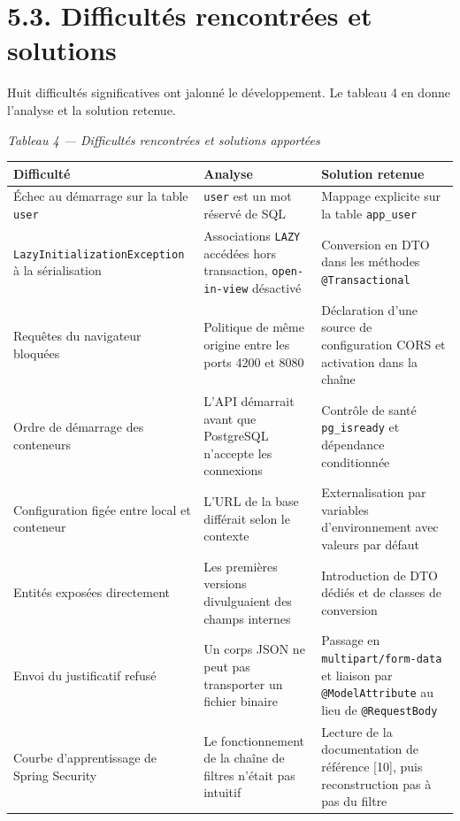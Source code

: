 \documentclass[12pt,a4paper]{report}
\begin{document}
\section*{5.3. Difficultés rencontrées et solutions}
Huit difficultés significatives ont jalonné le développement. Le tableau 4 en donne l'analyse et la solution retenue.
\begin{center}\textit{Tableau 4 — Difficultés rencontrées et solutions apportées}\end{center}
{\small
\begin{tabularx}{\linewidth}{|X|X|X|}
\hline
\textbf{Difficulté} & \textbf{Analyse} & \textbf{Solution retenue} \\ \hline
Échec au démarrage sur la table \texttt{user} & \texttt{user} est un mot réservé de SQL & Mappage explicite sur la table \texttt{app\_user} \\ \hline
\texttt{LazyInitializationException} à la sérialisation & Associations \texttt{LAZY} accédées hors transaction, \texttt{open-in-view} désactivé & Conversion en DTO dans les méthodes \texttt{@Transactional} \\ \hline
Requêtes du navigateur bloquées & Politique de même origine entre les ports 4200 et 8080 & Déclaration d'une source de configuration CORS et activation dans la chaîne \\ \hline
Ordre de démarrage des conteneurs & L'API démarrait avant que PostgreSQL n'accepte les connexions & Contrôle de santé \texttt{pg\_isready} et dépendance conditionnée \\ \hline
Configuration figée entre local et conteneur & L'URL de la base différait selon le contexte & Externalisation par variables d'environnement avec valeurs par défaut \\ \hline
Entités exposées directement & Les premières versions divulguaient des champs internes & Introduction de DTO dédiés et de classes de conversion \\ \hline
Envoi du justificatif refusé & Un corps JSON ne peut pas transporter un fichier binaire & Passage en \texttt{multipart/form-data} et liaison par \texttt{@ModelAttribute} au lieu de \texttt{@RequestBody} \\ \hline
Courbe d'apprentissage de Spring Security & Le fonctionnement de la chaîne de filtres n'était pas intuitif & Lecture de la documentation de référence [10], puis reconstruction pas à pas du filtre \\ \hline
\end{tabularx}

}
\end{document}
